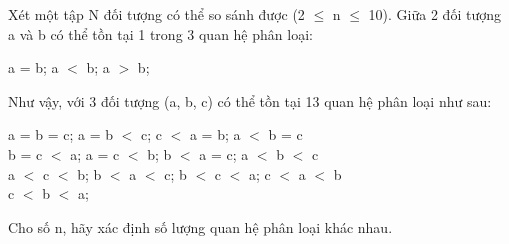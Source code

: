 Xét một tập N đối tượng có thể so sánh được (2 $\le$ n $\le$ 10). Giữa 2 đối tượng a và b có thể tồn tại 1 trong 3 quan hệ phân loại:

a = b; a $<$ b; a $>$ b;

Như vậy, với 3 đối tượng (a, b, c) có thể tồn tại 13 quan hệ phân loại như sau:

a = b = c; a = b $<$ c; c $<$ a = b; a $<$ b = c
\\b = c $<$ a; a = c $<$ b; b $<$ a = c; a $<$ b $<$ c
\\a $<$ c $<$ b; b $<$ a $<$ c; b $<$ c $<$ a; c $<$ a $<$ b
\\c $<$ b $<$ a;

Cho số n, hãy xác định số lượng quan hệ phân loại khác nhau.